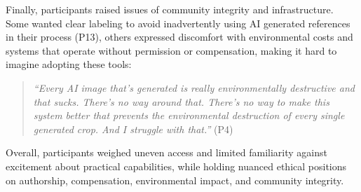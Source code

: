 Finally, participants raised issues of community integrity and infrastructure. Some wanted clear labeling to avoid inadvertently using AI generated references in their process (P13), others expressed discomfort with environmental costs and systems that operate without permission or compensation, making it hard to imagine adopting these tools: 
\begin{quote}
    \textit{``Every AI image that's generated is really environmentally destructive and that sucks. There's no way around that. There's no way to make this system better that prevents the environmental destruction of every single generated crop. And I struggle with that.''} (P4)
\end{quote}
Overall, participants weighed uneven access and limited familiarity against excitement about practical capabilities, while holding nuanced ethical positions on authorship, compensation, environmental impact, and community integrity.







